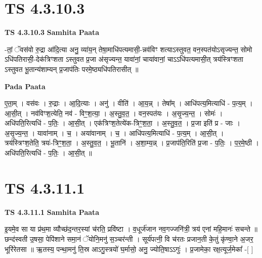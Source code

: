 \documentclass[17pt]{extarticle}
\begin{document}

\section{ TS 4.3.10.3 }

\textbf{TS 4.3.10.3 } \newline
\textbf{Samhita Paata} \newline

-तां॒ ॅवस॑वो रु॒द्रा आ॑दि॒त्या अनु॒ व्या॑य॒न् तेषा॒माधि॑पत्यमासी॒-न्नव॑विꣳ शत्याऽस्तुवत॒ वन॒स्पत॑योऽसृज्यन्त॒ सोमो ऽधि॑पतिरासी॒-देक॑त्रिꣳशता ऽस्तुवत प्र॒जा अ॑सृज्यन्त॒ यावा॑नां॒ चाया॑वानां॒ चाऽऽधि॑पत्यमासी॒त् त्रय॑स्त्रिꣳशता ऽस्तुवत भू॒तान्य॑शाम्यन् प्र॒जाप॑तिः परमे॒ष्ठ्यधि॑पतिरासीत् ॥ \newline

\textbf{Pada Paata} \newline

ए॒ता॒म् । वस॑वः । रु॒द्राः । आ॒दि॒त्याः । अनु॑ । वीति॑ । आ॒य॒न्न् । तेषा᳚म् । आधि॑पत्य॒मित्याधि॑ - प॒त्य॒म् । आ॒सी॒त् । नव॑विꣳश॒त्येति॒ नव॑ - विꣳ॒॒श॒त्या॒ । अ॒स्तु॒व॒त॒ । वन॒स्पत॑यः । अ॒सृ॒ज्य॒न्त॒ । सोमः॑ । अधि॑पति॒रित्यधि॑ - प॒तिः॒ । आ॒सी॒त् । एक॑त्रिꣳश॒तेत्ये॑क-त्रिꣳ॒॒श॒ता॒ । अ॒स्तु॒व॒त॒ । प्र॒जा इति॑ प्र - जाः । अ॒सृ॒ज्य॒न्त॒ । यावा॑नाम् । च॒ । अया॑वानाम् । च॒ । आधि॑पत्य॒मित्याधि॑ - प॒त्य॒म् । आ॒सी॒त् । त्रय॑स्त्रिꣳश॒तेति॒ त्रयः॑-त्रिꣳ॒॒श॒ता॒ । अ॒स्तु॒व॒त॒ । भू॒तानि॑ । अ॒शा॒म्य॒न्न् । प्र॒जाप॑ति॒रिति॑ प्र॒जा - प॒तिः॒ । प॒र॒मे॒ष्ठी । अधि॑पति॒रित्यधि॑ - प॒तिः॒ । आ॒सी॒त् ॥  \newline





\section{ TS 4.3.11.1 }

\textbf{TS 4.3.11.1 } \newline
\textbf{Samhita Paata} \newline

इ॒यमे॒व सा या प्र॑थ॒मा व्यौच्छ॑द॒न्तर॒स्यां च॑रति॒ प्रवि॑ष्टा । व॒धूर्ज॑जान नव॒गज्जनि॑त्री॒ त्रय॑ एनां महि॒मानः॑ सचन्ते ॥ छन्द॑स्वती उ॒षसा॒ पेपि॑शाने समा॒नं ॅयोनि॒मनु॑ स॒ञ्चर॑न्ती । सूर्य॑पत्नी॒ वि च॑रतः प्रजान॒ती के॒तुं कृ॑ण्वा॒ने अ॒जर॒ भूरि॑रेतसा ॥ ऋ॒तस्य॒ पन्था॒मनु॑ ति॒स्र आऽगु॒स्त्रयो॑ घ॒र्मासो॒ अनु॒ ज्योति॒षाऽऽगुः॑ । प्र॒जामेका॒ रक्ष॒त्यूर्ज॒मेका᳚ -[  ] \newline
\end{document}
